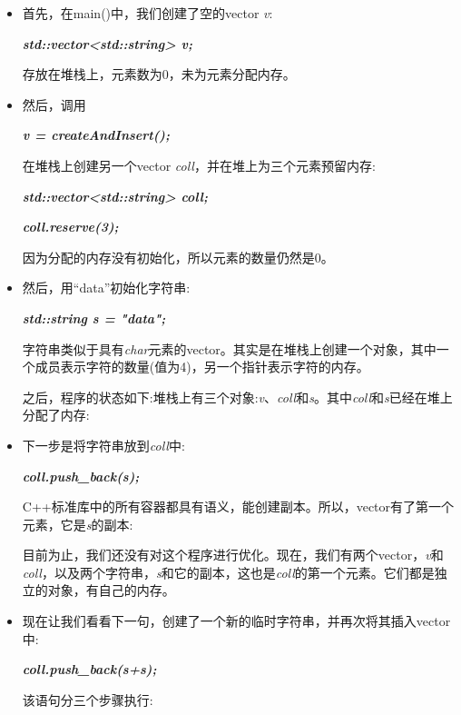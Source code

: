 \begin{itemize}
  \item 首先，在main()中，我们创建了空的vector \textit{v}:\par
  \textit{\textbf{std::\allowbreak{}vector<\allowbreak{}std::\allowbreak{}string> v;}} \par
  存放在堆栈上，元素数为0，未为元素分配内存。
  \item 然后，调用\par
  \textit{\textbf{v =\allowbreak{} createAndInsert(\allowbreak{})\allowbreak{};}}\par
  在堆栈上创建另一个vector \textit{coll}，并在堆上为三个元素预留内存:\par
  \textit{\textbf{std::\allowbreak{}vector<\allowbreak{}std::\allowbreak{}string> coll;}}\par
  \textit{\textbf{coll.reserve(\allowbreak{}3)\allowbreak{};}}\par
  因为分配的内存没有初始化，所以元素的数量仍然是0。
  \item 然后，用“data”初始化字符串:\par
  \textit{\textbf{std::\allowbreak{}string s =\allowbreak{} "data";}}\par
  字符串类似于具有\textit{char}元素的vector。其实是在堆栈上创建一个对象，其中一个成员表示字符的数量(值为4)，另一个指针表示字符的内存。\par
  之后，程序的状态如下:堆栈上有三个对象:\textit{v}、\textit{coll}和\textit{s}。其中\textit{coll}和\textit{s}已经在堆上分配了内存:\par
{}
  \item 下一步是将字符串放到\textit{coll}中:\par
  \textbf{\textit{coll.push\_\allowbreak{}back(\allowbreak{}s)\allowbreak{};}}\par
  C++标准库中的所有容器都具有语义，能创建副本。所以，vector有了第一个元素，它是\textit{s}的副本:\par
{}
  目前为止，我们还没有对这个程序进行优化。现在，我们有两个vector，\textit{v}和\textit{coll}，以及两个字符串，\textit{s}和它的副本，这也是\textit{coll}的第一个元素。它们都是独立的对象，有自己的内存。\par
  \item 现在让我们看看下一句，创建了一个新的临时字符串，并再次将其插入vector中:\par
  \textbf{\textit{coll.push\_\allowbreak{}back(\allowbreak{}s+s)\allowbreak{};}}\par
  该语句分三个步骤执行:\par

\end{itemize}
